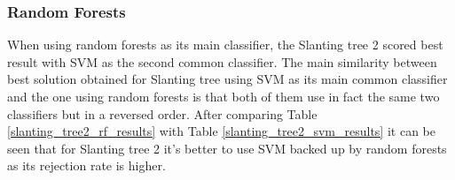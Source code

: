 \subsubsection{Random Forests}

When using random forests as its main classifier, the Slanting tree 2 scored best result with SVM as the second common classifier. The main similarity between best solution obtained for Slanting tree using SVM as its main common classifier and the one using random forests is that both of them use in fact the same two classifiers but in a reversed order. After comparing Table \ref{slanting_tree2_rf_results} with Table \ref{slanting_tree2_svm_results} it can be seen that for Slanting tree 2 it's better to use SVM backed up by random forests as its rejection rate is higher.

\begin{table}[htp]
	\centering
	\caption{Results for Slanting tree using Random Forests classifier with n\_estimators=30 combined with SVM with kernel=rbf, C=16 and gamma=0.5}
	\label{slanting_tree2_rf_results}
\end{table}
